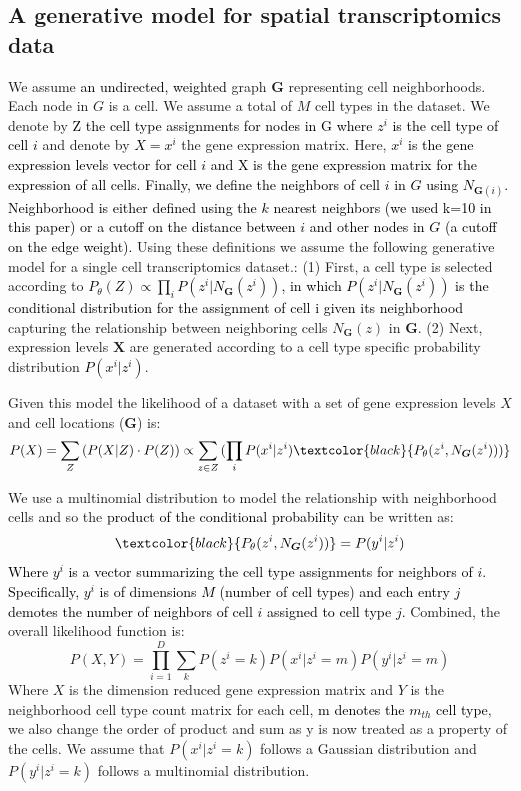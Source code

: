 \subsection{A generative model for spatial transcriptomics data}
We assume  \textcolor{black}{an undirected, weighted} graph $\boldsymbol{G}$ representing cell neighborhoods. Each node in $G$ is a cell. We assume a total of $M$ cell types in the dataset. We denote by \textcolor{black}{Z  the cell type assignments for nodes in G where $z^i$ is the cell type of cell $i$} and denote by \textcolor{black}{$X = {x^{i}}$} the gene expression matrix. Here, \textcolor{black}{$x^{i}$ is the gene expression levels vector for cell $i$ and X is the gene expression matrix for the expression of all cells. Finally, we define the neighbors of cell $i$ in $G$  using $ N_{\boldsymbol{G}(i)}$. Neighborhood is either defined using the $k$ nearest neighbors (we used k=10 in this paper) or a cutoff on the distance between $i$ and other nodes in $G$ (a cutoff on the edge weight).}
Using these definitions we assume the following generative model for a single cell transcriptomics dataset.: (1) First, a cell type is selected according to \textcolor{black}{$P_{\theta}(Z) \propto \prod_{i}{P(z^i|N_{\boldsymbol{G}}(z^i))}$, in which $P(z^i|N_{\boldsymbol{G}}(z^i))$ is the conditional distribution for the assignment of cell i given its neighborhood} capturing the relationship between neighboring cells $N_{\boldsymbol{G}}(z)$ in $\boldsymbol{G}$. (2) Next, expression levels $\mathbf{X}$ are generated according to a cell type specific probability distribution \textcolor{black}{$P(x^{i}|z^{i})$}.

Given this model the likelihood of a dataset with a set of gene expression levels $X$ and cell locations ($\boldsymbol{G}$) is:
\begin{equation}
P(X) =\sum_{Z}{({P(X|Z)}\cdot P(Z))} \propto \sum_{z \in Z}{(\prod_{i}{P(x^i|z^i)}\textcolor{black}{P_{\theta}(z^i,N_{\boldsymbol{G}}(z^i)))}}
\end{equation} 

We use a multinomial distribution to model the relationship with neighborhood cells and so the \textcolor{black}{product of the conditional probability} can be written as:
\begin{equation}
    \textcolor{black}{P_{\theta}(z^i,N_{\boldsymbol{G}}(z^i))} = P(y^i|z^i)
\end{equation}
\textcolor{black}{Where $y^i$ is a vector summarizing the cell type assignments for neighbors of $i$. Specifically, $y^i$ is of dimensions $M$ (number of cell types) and each entry $j$ demotes the number of neighbors of cell $i$ assigned to cell type $j$.}
Combined, the overall likelihood function is:
\begin{equation}
P(X,Y) = \prod_{i=1}^{D}{ \sum_{k}{P(z^i=k)P(x^i|z^i=m)P(y^i|z^i=m)}} 
\end{equation}
Where $X$ is the dimension reduced gene expression matrix and $Y$ is the neighborhood cell type count matrix for each cell, \textcolor{black}{m denotes the $m_{th}$ cell type}, we also change the order of product and sum as y is now treated as a property of the cells. We assume that $P(x^i|z^i=k)$ follows a Gaussian distribution and $P(y^i|z^i=k)$ follows a multinomial distribution. 

